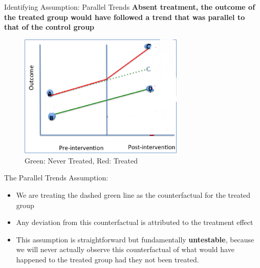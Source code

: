 \documentclass[
  ignorenonframetext,
]{beamer}
\begin{document}
\begin{frame}{Identifying Assumption: Parallel Trends}
\protect\hypertarget{identifying-assumption-parallel-trends}{}
\textbf{Absent treatment, the outcome of the treated group would have
followed a trend that was parallel to that of the control group}

\begin{figure}
\centering
\includegraphics[width=0.7\textwidth,height=\textheight]{"images/DIDregressionblank.png"}
\caption{Green: Never Treated, Red: Treated}
\end{figure}
\end{frame}

\begin{frame}{The Parallel Trends Assumption:}
\protect\hypertarget{the-parallel-trends-assumption}{}
\begin{itemize}
\item
  We are treating the dashed green line as the counterfactual for the
  treated group
\item
  Any deviation from this counterfactual is attributed to the treatment
  effect
\item
  This assumption is straightforward but fundamentally
  \textbf{untestable}, because we will never actually observe this
  counterfactual of what would have happened to the treated group had
  they not been treated.
\end{itemize}
\end{frame}
\end{document}
